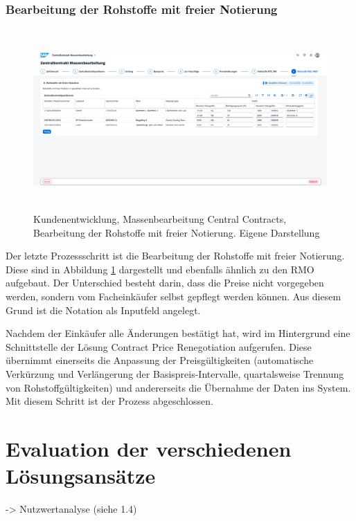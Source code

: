 \subsubsection{Bearbeitung der Rohstoffe mit freier Notierung}

\begin{figure}[H]
    \centering
    \includegraphics[height=6.91cm]{Bilder/Praxisteil-KL-Schritt-8.png}
    \caption[Kundenentwicklung, Massenbearbeitung Central Contracts, Bearbeitung der Rohstoffe mit freier Notierung]{Kundenentwicklung, Massenbearbeitung Central Contracts, Bearbeitung der Rohstoffe mit freier Notierung. Eigene Darstellung}
    \label{fig:PraxisKLSchritt8}
\end{figure}

Der letzte Prozessschritt ist die Bearbeitung der Rohstoffe mit freier Notierung. Diese sind in Abbildung \ref{fig:PraxisKLSchritt8} dargestellt und ebenfalls ähnlich zu den RMO aufgebaut. Der Unterschied besteht darin, dass die Preise nicht vorgegeben werden, sondern vom Facheinkäufer selbst gepflegt werden können. Aus diesem Grund ist die Notation als Inputfeld angelegt.

Nachdem der Einkäufer alle Änderungen bestätigt hat, wird im Hintergrund eine Schnittstelle der Lösung Contract Price Renegotiation aufgerufen. Diese übernimmt einerseits die Anpassung der Preisgültigkeiten (automatische Verkürzung und Verlängerung der Basispreis-Intervalle, quartalsweise Trennung von Rohstoffgültigkeiten) und andererseits die Übernahme der Daten ins System. Mit diesem Schritt ist der Prozess abgeschlossen.

\section{Evaluation der verschiedenen Lösungsansätze}

-> Nutzwertanalyse (siehe 1.4)